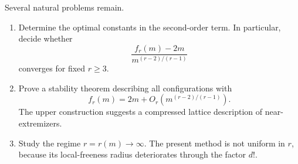 \documentclass[11pt]{article}
\theoremstyle{definition}
\newcommand{\1}{\mathbf{1}}
\begin{document}
Several natural problems remain.
\begin{enumerate}[label=\arabic*.]
  \item Determine the optimal constants in the second-order term.  In particular, decide whether
  \[
    \frac{f_r(m)-2m}{m^{(r-2)/(r-1)}}
  \]
  converges for fixed $r\ge3$.
  \item Prove a stability theorem describing all configurations with
  \[
    f_r(m)=2m+O_r\!\left(m^{(r-2)/(r-1)}\right).
  \]
  The upper construction suggests a compressed lattice description of near-extremizers.
  \item Study the regime $r=r(m)\to\infty$.  The present method is not uniform in $r$, because its local-freeness radius deteriorates through the factor $d!$.
\end{enumerate}
\end{document}

